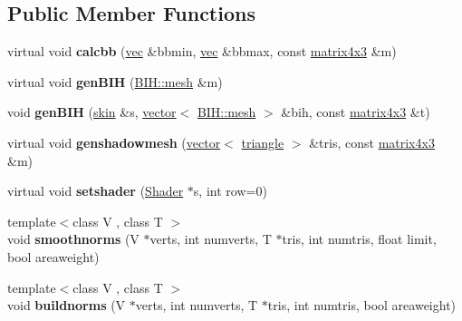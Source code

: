 \subsection*{Public Member Functions}
\begin{DoxyCompactItemize}
\item 
\mbox{\label{structanimmodel_1_1mesh_ad786c1648b088539b073c070850110c4}} 
virtual void {\bfseries calcbb} (\hyperlink{structvec}{vec} \&bbmin, \hyperlink{structvec}{vec} \&bbmax, const \hyperlink{structmatrix4x3}{matrix4x3} \&m)
\item 
\mbox{\label{structanimmodel_1_1mesh_a3e7dfcc86f7dc00f449920c0f8841a04}} 
virtual void {\bfseries gen\+B\+IH} (\hyperlink{struct_b_i_h_1_1mesh}{B\+I\+H\+::mesh} \&m)
\item 
\mbox{\label{structanimmodel_1_1mesh_a80da4277433e08bac26e7d77670bd080}} 
void {\bfseries gen\+B\+IH} (\hyperlink{structanimmodel_1_1skin}{skin} \&s, \hyperlink{structvector}{vector}$<$ \hyperlink{struct_b_i_h_1_1mesh}{B\+I\+H\+::mesh} $>$ \&bih, const \hyperlink{structmatrix4x3}{matrix4x3} \&t)
\item 
\mbox{\label{structanimmodel_1_1mesh_a73245d5bc464c4b92ae81c4bf638875d}} 
virtual void {\bfseries genshadowmesh} (\hyperlink{structvector}{vector}$<$ \hyperlink{structtriangle}{triangle} $>$ \&tris, const \hyperlink{structmatrix4x3}{matrix4x3} \&m)
\item 
\mbox{\label{structanimmodel_1_1mesh_ade162fa6b82ae67226136be0c191186e}} 
virtual void {\bfseries setshader} (\hyperlink{struct_shader}{Shader} $\ast$s, int row=0)
\item 
\mbox{\label{structanimmodel_1_1mesh_a99c63711cb3a0d380dab5f2d5a01ec07}} 
{\footnotesize template$<$class V , class T $>$ }\\void {\bfseries smoothnorms} (V $\ast$verts, int numverts, T $\ast$tris, int numtris, float limit, bool areaweight)
\item 
\mbox{\label{structanimmodel_1_1mesh_ad306c9f3ed4469c326152e3ee0aed520}} 
{\footnotesize template$<$class V , class T $>$ }\\void {\bfseries buildnorms} (V $\ast$verts, int numverts, T $\ast$tris, int numtris, bool areaweight)

\end{DoxyCompactItemize}
